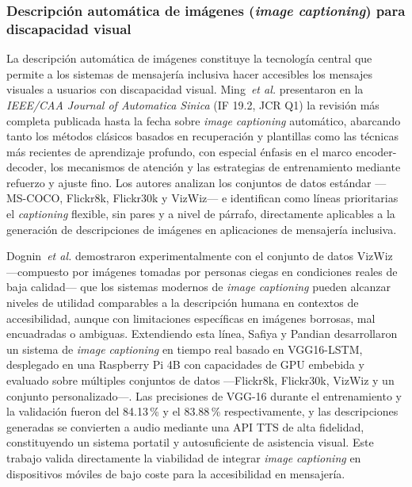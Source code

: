 \documentclass[journal]{IEEEtran}
\begin{document}
	\subsubsection{Descripci\'on autom\'atica de im\'agenes (\textit{image captioning}) para discapacidad visual}
	La descripci\'on autom\'atica de im\'agenes constituye la tecnolog\'ia central que permite a los sistemas de mensajer\'ia inclusiva hacer accesibles los mensajes visuales a usuarios con discapacidad visual. Ming~\textit{et al.} \cite{ming2022} presentaron en la \textit{IEEE/CAA Journal of Automatica Sinica} (IF 19.2, JCR Q1) la revisi\'on m\'as completa publicada hasta la fecha sobre \textit{image captioning} autom\'atico, abarcando tanto los m\'etodos cl\'asicos basados en recuperaci\'on y plantillas como las t\'ecnicas m\'as recientes de aprendizaje profundo, con especial \'enfasis en el marco encoder-decoder, los mecanismos de atenci\'on y las estrategias de entrenamiento mediante refuerzo y ajuste fino. Los autores analizan los conjuntos de datos est\'andar ---MS-COCO, Flickr8k, Flickr30k y VizWiz--- e identifican como l\'ineas prioritarias el \textit{captioning} flexible, sin pares y a nivel de p\'arrafo, directamente aplicables a la generaci\'on de descripciones de im\'agenes en aplicaciones de mensajer\'ia inclusiva.
	
	Dognin~\textit{et al.} \cite{dognin2021} demostraron experimentalmente con el conjunto de datos VizWiz ---compuesto por im\'agenes tomadas por personas ciegas en condiciones reales de baja calidad--- que los sistemas modernos de \textit{image captioning} pueden alcanzar niveles de utilidad comparables a la descripci\'on humana en contextos de accesibilidad, aunque con limitaciones espec\'ificas en im\'agenes borrosas, mal encuadradas o ambiguas. Extendiendo esta l\'inea, Safiya y Pandian \cite{safiya2024} desarrollaron un sistema de \textit{image captioning} en tiempo real basado en VGG16-LSTM, desplegado en una Raspberry Pi 4B con capacidades de GPU embebida y evaluado sobre m\'ultiples conjuntos de datos ---Flickr8k, Flickr30k, VizWiz y un conjunto personalizado---. Las precisiones de VGG-16 durante el entrenamiento y la validaci\'on fueron del 84.13\,\% y el 83.88\,\% respectivamente, y las descripciones generadas se convierten a audio mediante una API TTS de alta fidelidad, constituyendo un sistema portatil y autosuficiente de asistencia visual. Este trabajo valida directamente la viabilidad de integrar \textit{image captioning} en dispositivos m\'oviles de bajo coste para la accesibilidad en mensajer\'ia.
	
\end{document}
